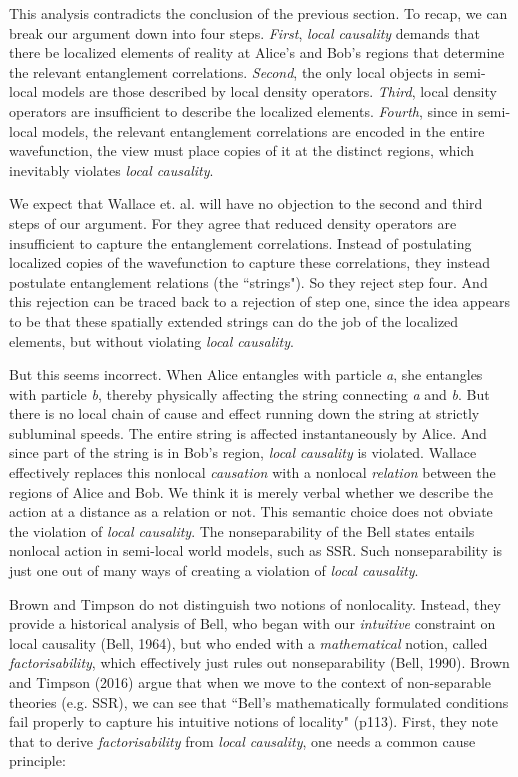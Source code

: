 \documentclass[a4paper]{article}
\begin{document}
This analysis contradicts the conclusion of the previous section. To recap, we can break our argument down into four steps. \textit{First}, \textit{local causality} demands that there be localized elements of reality at Alice's and Bob's regions that determine the relevant entanglement correlations. \textit{Second}, the only local objects in semi-local models are those described by local density operators. \textit{Third}, local density operators are insufficient to describe the localized elements. \textit{Fourth}, since in semi-local models, the relevant entanglement correlations are encoded in the entire wavefunction, the view must place copies of it at the distinct regions, which inevitably violates \textit{local causality}. 

We expect that Wallace et. al. will have no objection to the second and third steps of our argument. For they agree that reduced density operators are insufficient to capture the entanglement correlations. Instead of postulating localized copies of the wavefunction to capture these correlations, they instead postulate entanglement relations (the ``strings"). So they reject step four. And this rejection can be traced back to a rejection of step one, since the idea appears to be that these spatially extended strings can do the job of the localized elements, but without violating \textit{local causality}. 

But this seems incorrect. When Alice entangles with particle \textit{a}, she entangles with particle \textit{b}, thereby physically affecting the string connecting \textit{a} and \textit{b}. But there is no local chain of cause and effect running down the string at strictly subluminal speeds. The entire string is affected instantaneously by Alice. And since part of the string is in Bob's region, \textit{local causality} is violated. Wallace effectively replaces this nonlocal \textit{causation} with a nonlocal \textit{relation} between the regions of Alice and Bob. We think it is merely verbal whether we describe the action at a distance as a relation or not. This semantic choice does not obviate the violation of \textit{local causality}. The nonseparability of the Bell states entails nonlocal action in semi-local world models, such as SSR. Such nonseparability is just one out of many ways of creating a violation of \textit{local causality}. 

Brown and Timpson do not distinguish two notions of nonlocality. Instead, they provide a historical analysis of Bell, who began with our \textit{intuitive} constraint on local causality (Bell, 1964), but who ended with a \textit{mathematical} notion, called \textit{factorisability}, which effectively just rules out nonseparability (Bell, 1990). Brown and Timpson (2016) argue that when we move to the context of non-separable theories (e.g. SSR), we can see that ``Bell's mathematically formulated conditions fail properly to capture his intuitive notions of locality" (p113). First, they note that to derive \textit{factorisability} from \textit{local causality}, one needs a common cause principle:
\end{document}
